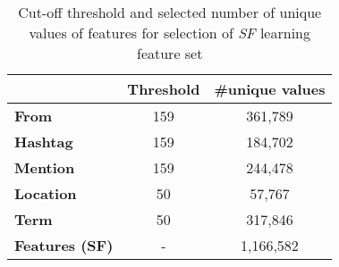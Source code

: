 



\begin{table}[!h]
\centering
{\footnotesize \renewcommand{\arraystretch}{1.2}
\begin{tabular}{|l|c|c|}
\hline
 & \textbf{Threshold} & \textbf{\#unique values} \\ \hline
\textbf{From} & 159 & 361,789 \\ \hline
\textbf{Hashtag} & 159 & 184,702 \\ \hline
\textbf{Mention} & 159 & 244,478 \\ \hline
\textbf{Location} & 50 & 57,767 \\ \hline
\textbf{Term} & 50 & 317,846 \\ \hline
\textbf{Features (SF)} & - & 1,166,582 \\ \hline
\end{tabular}
}
\caption{Cut-off threshold and selected number of unique values of features for selection of \textit{SF} learning feature set}
\label{table:learningFeatures}
\end{table}

